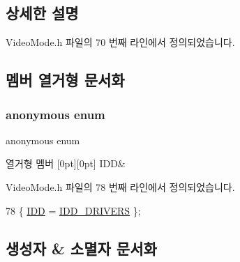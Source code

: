 \subsection{상세한 설명}


Video\+Mode.\+h 파일의 70 번째 라인에서 정의되었습니다.



\subsection{멤버 열거형 문서화}
\mbox{\label{class_video_driver_select_aca4a8f04ceb8dbf7c359c6c185573af6}} 
\subsubsection{\texorpdfstring{anonymous enum}{anonymous enum}}
{\footnotesize\ttfamily anonymous enum}

\begin{DoxyEnumFields}{열거형 멤버}
[0pt][0pt]{}\mbox{\label{class_video_driver_select_aca4a8f04ceb8dbf7c359c6c185573af6add6bc5e0e3b72451b510ce04d102930f}} 
I\+DD&\\
\hline

\end{DoxyEnumFields}


Video\+Mode.\+h 파일의 78 번째 라인에서 정의되었습니다.


\begin{DoxyCode}
78 \{ \mbox{\hyperlink{class_video_driver_select_aca4a8f04ceb8dbf7c359c6c185573af6add6bc5e0e3b72451b510ce04d102930f}{IDD}} = \mbox{\hyperlink{resource_8h_a7e1512c0a04b7560dcca29e3a6723b08}{IDD\_DRIVERS}} \};
\end{DoxyCode}


\subsection{생성자 \& 소멸자 문서화}
\mbox{\label{class_video_driver_select_aca923e596b34b0189bb365ef0850dada}} 
